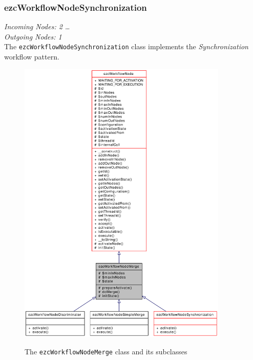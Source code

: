 \subsubsection{ezcWorkflowNodeSynchronization}

\emph{Incoming Nodes: 2 \dots *}\\
\emph{Outgoing Nodes: 1}\\

The \texttt{ezcWorkflowNodeSynchronization} class implements the
\emph{Synchronization} workflow pattern.

\begin{figure}[hbt]
\begin{center}
\includegraphics[width=10cm]{figures/WorkflowNodeMerge}\\[5mm]
\end{center}
\caption{The \texttt{ezcWorkflowNodeMerge} class and its subclasses}
\label{classezcWorkflowNodeMerge}
\end{figure}

